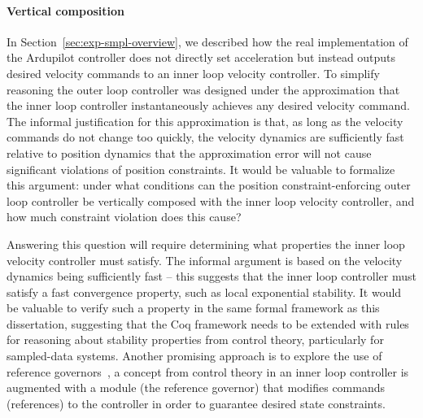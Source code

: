 \paragraph{Vertical composition}
In Section~\ref{sec:exp-smpl-overview}, we described how the real
implementation of the Ardupilot controller does not directly set
acceleration but instead outputs desired velocity commands to an inner loop
velocity controller. To simplify reasoning the outer loop controller was
designed under the approximation that the inner loop controller
instantaneously achieves any desired velocity command. The informal
justification for this approximation is that, as long as the velocity
commands do not change too quickly, the velocity dynamics are sufficiently
fast relative to position dynamics that the approximation error will not
cause significant violations of position constraints. It would be valuable
to formalize this argument: under what conditions can the position
constraint-enforcing outer loop controller be vertically composed with the
inner loop velocity controller, and how much constraint violation does this
cause?

Answering this question will require determining what properties the inner
loop velocity controller must satisfy. The informal argument is based on
the velocity dynamics being sufficiently fast -- this suggests that the
inner loop controller must satisfy a fast convergence property, such as
local exponential stability. It would be valuable to verify such a property
in the same formal framework as this dissertation, suggesting that the Coq
framework needs to be extended with rules for reasoning about stability
properties from control theory, particularly for sampled-data systems.
Another promising approach is to explore the use of reference
governors~\cite{bemporad98reference}, a concept from control theory in an
inner loop controller is augmented with a module (the reference governor)
that modifies commands (references) to the controller in order to guarantee
desired state constraints.

